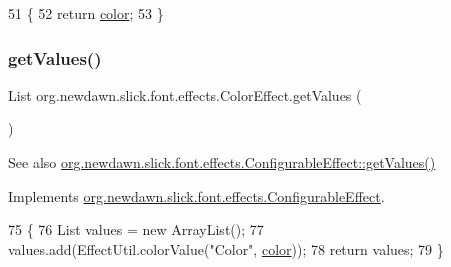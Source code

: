 \begin{DoxyCode}
51                             \{
52         \textcolor{keywordflow}{return} \mbox{\hyperlink{classorg_1_1newdawn_1_1slick_1_1font_1_1effects_1_1_color_effect_a2eb4f77d200293ea86166edce12f9817}{color}};
53     \}
\end{DoxyCode}
\mbox{\label{classorg_1_1newdawn_1_1slick_1_1font_1_1effects_1_1_color_effect_a295d74daac884b7e5dda1bbbd1263547}} 
\subsubsection{\texorpdfstring{get\+Values()}{getValues()}}
{\footnotesize\ttfamily List org.\+newdawn.\+slick.\+font.\+effects.\+Color\+Effect.\+get\+Values (\begin{DoxyParamCaption}{ }\end{DoxyParamCaption})\hspace{0.3cm}{\ttfamily [inline]}}

\begin{DoxySeeAlso}{See also}
\mbox{\hyperlink{interfaceorg_1_1newdawn_1_1slick_1_1font_1_1effects_1_1_configurable_effect_ac4ea8fedf0f9d7ca7ffe1bd5543d78cb}{org.\+newdawn.\+slick.\+font.\+effects.\+Configurable\+Effect\+::get\+Values()}} 
\end{DoxySeeAlso}


Implements \mbox{\hyperlink{interfaceorg_1_1newdawn_1_1slick_1_1font_1_1effects_1_1_configurable_effect_ac4ea8fedf0f9d7ca7ffe1bd5543d78cb}{org.\+newdawn.\+slick.\+font.\+effects.\+Configurable\+Effect}}.


\begin{DoxyCode}
75                             \{
76         List values = \textcolor{keyword}{new} ArrayList();
77         values.add(EffectUtil.colorValue(\textcolor{stringliteral}{"Color"}, \mbox{\hyperlink{classorg_1_1newdawn_1_1slick_1_1font_1_1effects_1_1_color_effect_a2eb4f77d200293ea86166edce12f9817}{color}}));
78         \textcolor{keywordflow}{return} values;
79     \}
\end{DoxyCode}
\mbox{\label{classorg_1_1newdawn_1_1slick_1_1font_1_1effects_1_1_color_effect_a2ffbac9b174a71718bf7fe933dd1fd52}} 
